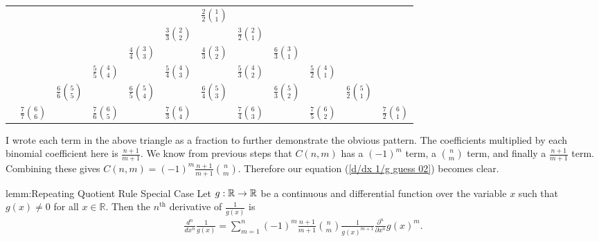 \begin{center}
	\renewcommand{\arraystretch}{1.5}
	\begin{tabular}{cccccccccccc}
	&    &    &    &    &    & $\frac{2}{2}\binom{1}{1}$  &    &    &    &    &    \\
	&    &    &    &    & $\frac{3}{3}\binom{2}{2}$  &    & $\frac{3}{2}\binom{2}{1}$  &    &    &    &    \\
	&    &    &    & $\frac{4}{4}\binom{3}{3}$  &    &  $\frac{4}{3}\binom{3}{2}$  &    & $\frac{6}{3}\binom{3}{1}$  &    &    &    \\
	&    &    & $\frac{5}{5}\binom{4}{4}$  &    &  $\frac{5}{4}\binom{4}{3}$   &    &  $\frac{5}{3}\binom{4}{2}$  &    & $\frac{5}{2}\binom{4}{1}$ &    &    \\
	&    & $\frac{6}{6}\binom{5}{5}$  &    &  $\frac{6}{5}\binom{5}{4}$   &    &  $\frac{6}{4}\binom{5}{3}$  &    &  $\frac{6}{3}\binom{5}{2}$  &    & $\frac{6}{2}\binom{5}{1}$ &    \\
	& $\frac{7}{7}\binom{6}{6}$  &    &  $\frac{7}{6}\binom{6}{5}$   &    &  $\frac{7}{3}\binom{6}{4}$  &    &  $\frac{7}{4}\binom{6}{3}$  &    &  $\frac{7}{5}\binom{6}{2}$  &    & $\frac{7}{2}\binom{6}{1}$  \\
	\end{tabular}
\end{center}
I wrote each term in the above triangle as a fraction to further demonstrate the obvious pattern. The coefficients multiplied by each binomial coefficient here is $\frac{n+1}{m+1}$. We know from previous steps that $C(n,m)$ has a $(-1)^m$ term, a $\binom{n}{m}$ term, and finally a $\frac{n+1}{m+1}$ term. Combining these gives $C(n,m) = (-1)^m\frac{n+1}{m+1}\binom{n}{m}$. Therefore our equation (\ref{d/dx 1/g guess 02}) becomes clear.

\begin{lemm}{lemm:Repeating Quotient Rule Special Case}
	Let $g:{\mathbb R} \to {\mathbb R}$ be a continuous and differential function over the variable $x$ such that $g(x) \neq 0$ for all $x\in\mathbb{R}$. Then the $n^{\text{th}}$ derivative of $\frac{1}{g(x)}$ is
\begin{align}
\frac{d^n}{dx^n}\frac{1}{g(x)} = \sum_{m=1}^{n}(-1)^m\frac{n+1}{m+1}\binom{n}{m}\frac{1}{g(x)^{m+1}}\frac{\partial^n}{\partial x^n}g(x)^m \label{d/dx 1/g guess 03}.
\end{align} 
\end{lemm}

